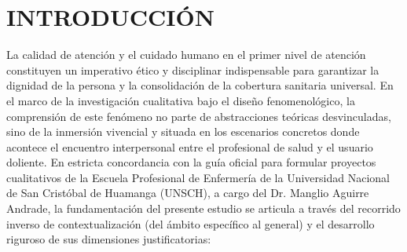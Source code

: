 \section*{INTRODUCCIÓN}
\label{sec:intro}

La calidad de atención y el cuidado humano en el primer nivel de atención constituyen un imperativo ético y disciplinar indispensable para garantizar la dignidad de la persona y la consolidación de la cobertura sanitaria universal. En el marco de la investigación cualitativa bajo el diseño fenomenológico, la comprensión de este fenómeno no parte de abstracciones teóricas desvinculadas, sino de la inmersión vivencial y situada en los escenarios concretos donde acontece el encuentro interpersonal entre el profesional de salud y el usuario doliente. En estricta concordancia con la guía oficial para formular proyectos cualitativos de la Escuela Profesional de Enfermería de la Universidad Nacional de San Cristóbal de Huamanga (UNSCH), a cargo del Dr. Manglio Aguirre Andrade, la fundamentación del presente estudio se articula a través del recorrido inverso de contextualización (del ámbito específico al general) y el desarrollo riguroso de sus dimensiones justificatorias:

